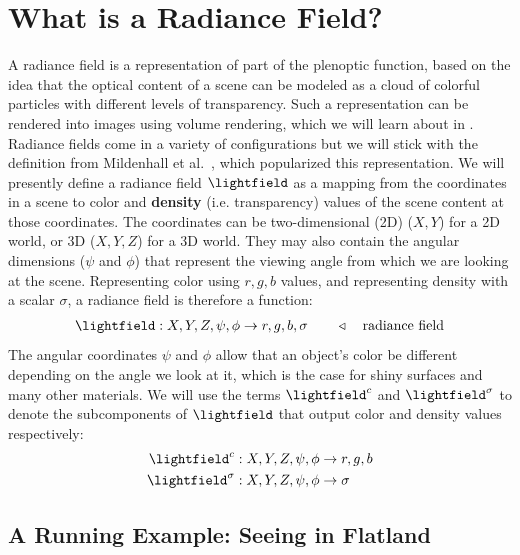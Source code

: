 \section{What is a Radiance Field?}
A radiance field is a representation of part of the plenoptic function, based on the idea that the optical content of a scene can be modeled as a cloud of colorful particles with different levels of transparency. Such a representation can be rendered into images using volume rendering, which we will learn about in \sect{\ref{sec:nerfs:volume_rendering}}. Radiance fields come in a variety of configurations but we will stick with the definition from Mildenhall et al.~\cite{mildenhall2020nerf}, which popularized this representation. We will presently define a radiance field $\lightfield$ as a mapping from the coordinates in a scene to color and \textbf{density} (i.e. transparency) values of the scene content at those coordinates. The coordinates can be two-dimensional (2D) ($X,Y$) for a 2D world, or 3D ($X,Y,Z$) for a 3D world. They may also contain the angular dimensions ($\psi$ and $\phi$) that represent the viewing angle from which we are looking at the scene. Representing color using $r,g,b$ values, and representing density with a scalar $\sigma$, a radiance field is therefore a function:%
\begin{align}
    \lightfield: X,Y,Z,\psi,\phi \rightarrow r,g,b,\sigma \quad\quad\triangleleft \quad\text{radiance field}
\end{align}
The angular coordinates $\psi$ and $\phi$ allow that an object's color be different depending on the angle we look at it, which is the case for shiny surfaces and many other materials. We will use the terms $\lightfield^c$ and $\lightfield^\sigma$ to denote the subcomponents of $\lightfield$ that output color and density values respectively:
\begin{align}
    \lightfield^c&: X,Y,Z,\psi,\phi \rightarrow r,g,b\\
    \lightfield^{\sigma}&: X,Y,Z,\psi,\phi \rightarrow\sigma
\end{align}

\subsection{A Running Example: Seeing in Flatland}

